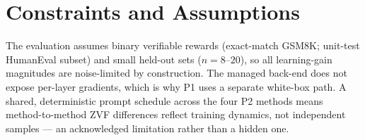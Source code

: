 \section{Constraints and Assumptions}
The evaluation assumes binary verifiable rewards (exact-match GSM8K; unit-test
HumanEval subset) and small held-out sets ($n=8$--$20$), so all learning-gain
magnitudes are noise-limited by construction. The managed back-end does not expose
per-layer gradients, which is why P1 uses a separate white-box path. A shared,
deterministic prompt schedule across the four P2 methods means method-to-method ZVF
differences reflect training dynamics, not independent samples --- an acknowledged
limitation rather than a hidden one.

